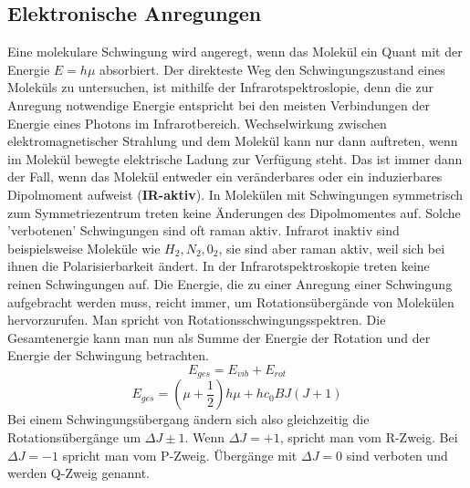 \documentclass[11pt]{article}
\begin{document}
\subsection{Elektronische Anregungen}
Eine molekulare Schwingung wird angeregt, wenn das Molekül ein Quant mit der
Energie $E=h\mu$ absorbiert. Der direkteste Weg den Schwingungszustand eines
Moleküls zu untersuchen, ist mithilfe der Infrarotspektroslopie, denn die zur
Anregung notwendige Energie entspricht bei den meisten Verbindungen der Energie
eines Photons im Infrarotbereich. Wechselwirkung zwischen elektromagnetischer
Strahlung und dem Molekül kann nur dann auftreten, wenn im Molekül bewegte
elektrische Ladung zur Verfügung steht. Das ist immer dann der Fall, wenn das
Molekül entweder ein veränderbares oder ein induzierbares Dipolmoment aufweist
(\textbf{IR-aktiv}). In Molekülen mit Schwingungen symmetrisch zum
Symmetriezentrum treten keine Änderungen des Dipolmomentes auf. Solche
'verbotenen' Schwingungen sind oft raman aktiv. Infrarot inaktiv sind
beispielsweise Moleküle wie $H_2, N_2, 0_2$, sie sind aber raman aktiv, weil
sich bei ihnen die Polarisierbarkeit ändert.
In der Infrarotspektroskopie treten keine reinen Schwingungen auf. Die Energie,
die zu einer Anregung einer Schwingung aufgebracht werden muss, reicht immer,
um Rotationsübergände von Molekülen hervorzurufen. Man spricht von
Rotationsschwingungsspektren. Die Gesamtenergie kann man nun als Summe der
Energie der Rotation und der Energie der Schwingung betrachten.
\begin{equation}
  E_{ges}=E_{vib}+E_{rot}
\end{equation}
\begin{equation}
  E_{ges}=\left(\mu+\frac{1}{2}\right)h\mu+hc_0BJ(J+1)
\end{equation}
Bei einem Schwingungsübergang ändern sich also gleichzeitig die
Rotationsübergänge um $\Delta J\pm1$. Wenn $\Delta J=+1$, spricht man vom
R-Zweig. Bei $\Delta J=-1$ spricht man vom P-Zweig. Übergänge mit $\Delta J=0$
sind verboten und werden Q-Zweig genannt.
\end{document}
